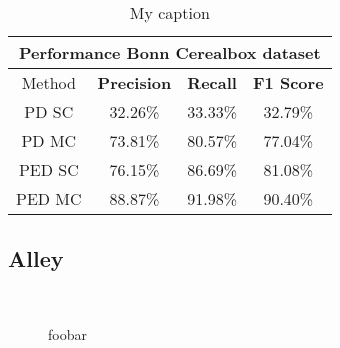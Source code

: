 \begin{table}[H]
\centering
\begin{tabular}{|c|c|c|c|}
\hline
\multicolumn{4}{|c|}{Performance Bonn Cerealbox dataset}                        \\ \hline
Method & \textbf{Precision} & \textbf{Recall} & \textbf{F1 Score} \\ \hline
PD SC & 32.26\%   & 33.33\%     & 32.79\%  \\ \hline
PD MC & 73.81\%   & 80.57\%     & 77.04\%  \\ \hline 
PED SC & 76.15\%   & 86.69\%     & 81.08\%  \\ \hline
PED MC & 88.87\%   & 91.98\%     & 90.40\%  \\ \hline               
\end{tabular}
\caption[Cars Varying $\lambda$]{My caption}
\label{tab:bonn_cerealbox_performance}
\end{table}

\subsection{Alley}

\begin{figure}[H]
\begin{center}
~
\end{center}
\caption[Bonn Cerealbox Segmentations]{foobar}
\label{fix:alley_segmentations}
\end{figure}











